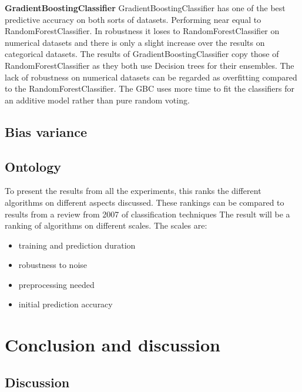 \documentclass[a4paper,10pt]{article}
\begin{document}
\textbf{GradientBoostingClassifier} GradientBoostingClassifier has one of the best predictive accuracy on both sorts of datasets. Performing near equal to RandomForestClassifier. In robustness it loses to RandomForestClassifier on numerical datasets and there is only a slight increase over the results on categorical datasets. The results of GradientBoostingClassifier copy those of RandomForestClassifier as they both use Decision trees for their ensembles. The lack of robustness on numerical datasets can be regarded as overfitting compared to the RandomForestClassifier. The GBC uses more time to fit the classifiers for an additive model rather than pure random voting.\\


\subsection{Bias variance}


\subsection{Ontology}
To present the results from all the experiments, this ranks the different algorithms on different aspects discussed.
These rankings can be compared to results from a review from 2007 of classification techniques \cite{RevClass}
The result will be a ranking of algorithms on different scales. The scales are:
\begin{itemize}
	\item training and prediction duration
	\item robustness to noise
	\item preprocessing needed
	\item initial prediction accuracy
\end{itemize} 








\newpage
\section{Conclusion and discussion} \label{Chapter5}

\subsection{Discussion}
\end{document}
